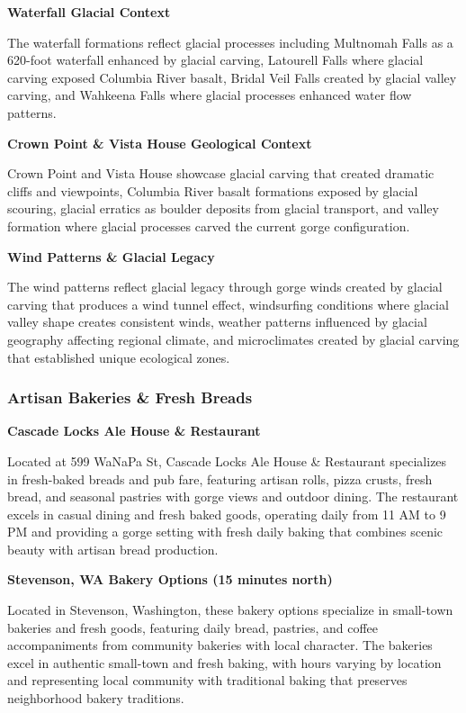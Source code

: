 \documentclass[
  11pt,
  letterpaper,
  DIV=10,
  numbers=noendperiod]{scrartcl}
\begin{document}
\textbf{Waterfall Glacial Context}

The waterfall formations reflect glacial processes including Multnomah
Falls as a 620-foot waterfall enhanced by glacial carving, Latourell
Falls where glacial carving exposed Columbia River basalt, Bridal Veil
Falls created by glacial valley carving, and Wahkeena Falls where
glacial processes enhanced water flow patterns.

\textbf{Crown Point \& Vista House Geological Context}

Crown Point and Vista House showcase glacial carving that created
dramatic cliffs and viewpoints, Columbia River basalt formations exposed
by glacial scouring, glacial erratics as boulder deposits from glacial
transport, and valley formation where glacial processes carved the
current gorge configuration.

\textbf{Wind Patterns \& Glacial Legacy}

The wind patterns reflect glacial legacy through gorge winds created by
glacial carving that produces a wind tunnel effect, windsurfing
conditions where glacial valley shape creates consistent winds, weather
patterns influenced by glacial geography affecting regional climate, and
microclimates created by glacial carving that established unique
ecological zones.

\subsubsection{Artisan Bakeries \& Fresh
Breads}\label{artisan-bakeries-fresh-breads-4}

\textbf{Cascade Locks Ale House \& Restaurant}

Located at 599 WaNaPa St, Cascade Locks Ale House \& Restaurant
specializes in fresh-baked breads and pub fare, featuring artisan rolls,
pizza crusts, fresh bread, and seasonal pastries with gorge views and
outdoor dining. The restaurant excels in casual dining and fresh baked
goods, operating daily from 11 AM to 9 PM and providing a gorge setting
with fresh daily baking that combines scenic beauty with artisan bread
production.

\textbf{Stevenson, WA Bakery Options (15 minutes north)}

Located in Stevenson, Washington, these bakery options specialize in
small-town bakeries and fresh goods, featuring daily bread, pastries,
and coffee accompaniments from community bakeries with local character.
The bakeries excel in authentic small-town and fresh baking, with hours
varying by location and representing local community with traditional
baking that preserves neighborhood bakery traditions.
\end{document}

